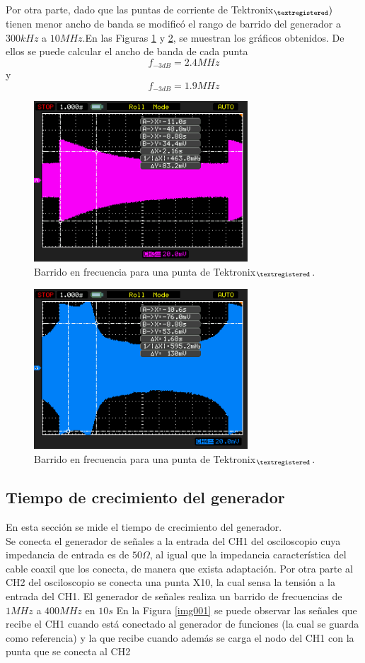 \documentclass[a4paper,10pt]{article}
\begin{document}
		Por otra parte, dado que las puntas de corriente de  Tektronix$_{\textregistered} )$ tienen menor ancho de banda se modific\'o el rango de barrido del generador a $300kHz$ a $10MHz$.En las Figuras \ref{img006} y \ref{img007}, se muestran los gr\'aficos obtenidos. De ellos se puede calcular el ancho de banda de cada punta
		$$f_{-3dB}=2.4MHz$$ y $$f_{-3dB}=1.9MHz$$
		\begin{figure}[!htb]
			\centering
			\includegraphics[width=8cm]{Imagenes/Mediciones instrumentos/NewFile7.png}
			\caption{Barrido en frecuencia para una punta de Tektronix$_{\textregistered}$.} \label{img006}
		\end{figure}		
	
		\begin{figure}[!htb]
			\centering
			\includegraphics[width=8cm]{Imagenes/Mediciones instrumentos/NewFile8.png}
			\caption{Barrido en frecuencia para una punta de Tektronix$_{\textregistered}$.} \label{img007}
		\end{figure}
		
		\subsection{Tiempo de crecimiento del generador}
		En esta secci\'on se mide el tiempo de crecimiento del generador. \\
 		\indent Se conecta el generador de se\~nales a la entrada del CH1 del osciloscopio cuya impedancia de entrada es de $50 \Omega$, al igual que la impedancia caracter\'istica del cable coaxil que los conecta, de manera que exista adaptaci\'on. Por otra parte al CH2 del osciloscopio se conecta una punta X10, la cual sensa la tensi\'on a la entrada del CH1.
		El generador de se\~nales realiza un barrido de frecuencias de $1MHz$ a $400MHz$ en $10s$
		En la Figura \ref{img001} se puede observar las se\~nales que recibe el CH1 cuando est\'a conectado al generador de funciones (la cual se guarda como referencia) y la que recibe cuando adem\'as se carga el nodo del CH1 con la punta que se conecta al CH2
		
\end{document}

